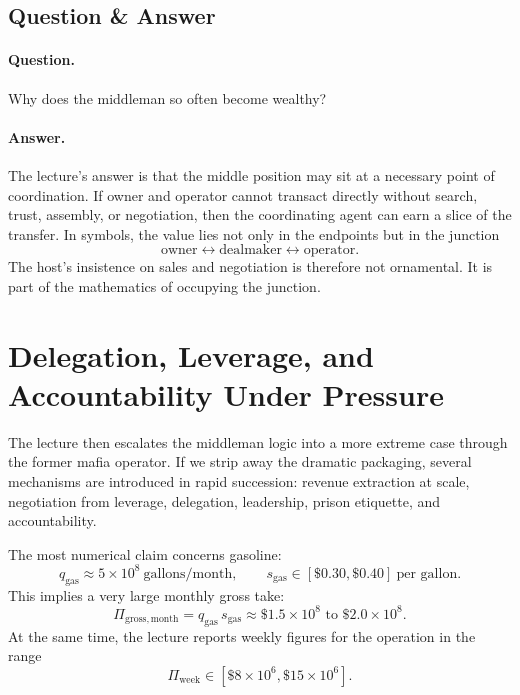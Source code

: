 \subsection{Question \& Answer}

\paragraph{Question.} Why does the middleman so often become wealthy?

\paragraph{Answer.} The lecture's answer is that the middle position may sit at a necessary point of coordination. If owner and operator cannot transact directly without search, trust, assembly, or negotiation, then the coordinating agent can earn a slice of the transfer. In symbols, the value lies not only in the endpoints but in the junction
\[
\text{owner}\longleftrightarrow \text{dealmaker}\longleftrightarrow \text{operator}.
\]
The host's insistence on sales and negotiation is therefore not ornamental. It is part of the mathematics of occupying the junction.

\section{Delegation, Leverage, and Accountability Under Pressure}

The lecture then escalates the middleman logic into a more extreme case through the former mafia operator. If we strip away the dramatic packaging, several mechanisms are introduced in rapid succession: revenue extraction at scale, negotiation from leverage, delegation, leadership, prison etiquette, and accountability.

The most numerical claim concerns gasoline:
\begin{equation}
q_{\mathrm{gas}}\approx 5\times 10^8\ \text{gallons/month}, \qquad
s_{\mathrm{gas}}\in[\$0.30,\$0.40]\ \text{per gallon}.
\end{equation}
This implies a very large monthly gross take:
\begin{equation}
\Pi_{\mathrm{gross,month}} = q_{\mathrm{gas}}\,s_{\mathrm{gas}}
\approx \$1.5\times 10^8 \text{ to } \$2.0\times 10^8.
\end{equation}
At the same time, the lecture reports weekly figures for the operation in the range
\begin{equation}
\Pi_{\mathrm{week}}\in[\$8\times 10^6,\$15\times 10^6].
\end{equation}

